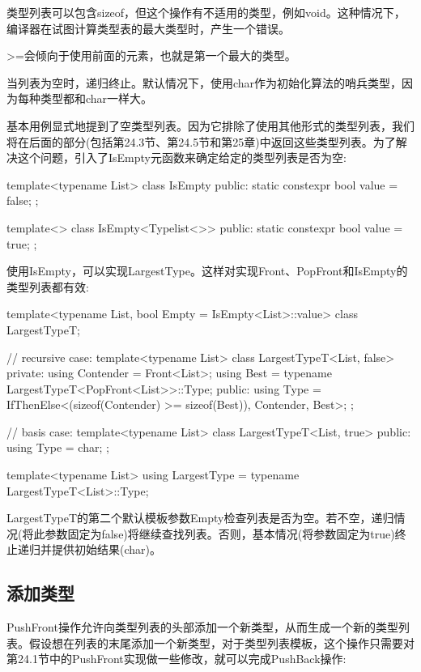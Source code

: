 \begin{notice}
类型列表可以包含sizeof，但这个操作有不适用的类型，例如void。这种情况下，编译器在试图计算类型表的最大类型时，产生一个错误。
\end{notice}

>=会倾向于使用前面的元素，也就是第一个最大的类型。

当列表为空时，递归终止。默认情况下，使用char作为初始化算法的哨兵类型，因为每种类型都和char一样大。

基本用例显式地提到了空类型列表。因为它排除了使用其他形式的类型列表，我们将在后面的部分(包括第24.3节、第24.5节和第25章)中返回这些类型列表。为了解决这个问题，引入了IsEmpty元函数来确定给定的类型列表是否为空:

\begin{cpp}
template<typename List>
class IsEmpty
{
	public:
	static constexpr bool value = false;
};

template<>
class IsEmpty<Typelist<>> {
	public:
	static constexpr bool value = true;
};
\end{cpp}

使用IsEmpty，可以实现LargestType。这样对实现Front、PopFront和IsEmpty的类型列表都有效:

\begin{cpp}
template<typename List, bool Empty = IsEmpty<List>::value>
class LargestTypeT;

// recursive case:
template<typename List>
class LargestTypeT<List, false>
{
	private:
	using Contender = Front<List>;
	using Best = typename LargestTypeT<PopFront<List>>::Type;
	public:
	using Type = IfThenElse<(sizeof(Contender) >= sizeof(Best)),
	Contender, Best>;
};

// basis case:
template<typename List>
class LargestTypeT<List, true>
{
	public:
	using Type = char;
};

template<typename List>
using LargestType = typename LargestTypeT<List>::Type;
\end{cpp}

LargestTypeT的第二个默认模板参数Empty检查列表是否为空。若不空，递归情况(将此参数固定为false)将继续查找列表。否则，基本情况(将参数固定为true)终止递归并提供初始结果(char)。

\subsection{添加类型}

PushFront操作允许向类型列表的头部添加一个新类型，从而生成一个新的类型列表。假设想在列表的末尾添加一个新类型，对于类型列表模板，这个操作只需要对第24.1节中的PushFront实现做一些修改，就可以完成PushBack操作:

